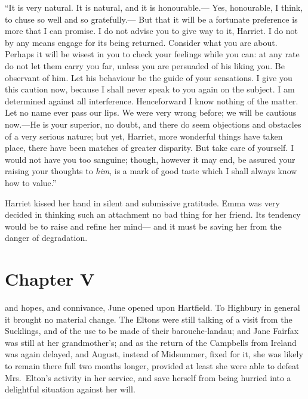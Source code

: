 ``It is very natural.  It is natural, and it is honourable.---%
Yes, honourable, I think, to chuse so well and so gratefully.---%
But that it will be a fortunate preference is more that I can promise.
I do not advise you to give way to it, Harriet.  I do not by any
means engage for its being returned.  Consider what you are about.
Perhaps it will be wisest in you to check your feelings while you can:
at any rate do not let them carry you far, unless you are persuaded
of his liking you.  Be observant of him.  Let his behaviour be the
guide of your sensations.  I give you this caution now, because I
shall never speak to you again on the subject.  I am determined
against all interference.  Henceforward I know nothing of the matter.
Let no name ever pass our lips.  We were very wrong before;
we will be cautious now.---He is your superior, no doubt, and there
do seem objections and obstacles of a very serious nature;
but yet, Harriet, more wonderful things have taken place, there have
been matches of greater disparity.  But take care of yourself.
I would not have you too sanguine; though, however it may end,
be assured your raising your thoughts to \emph{him}, is a mark of good taste
which I shall always know how to value.''

Harriet kissed her hand in silent and submissive gratitude.
Emma was very decided in thinking such an attachment no bad thing
for her friend.  Its tendency would be to raise and refine her mind---%
and it must be saving her from the danger of degradation.



\chapter{Chapter V}


 and hopes, and connivance, June opened
upon Hartfield.  To Highbury in general it brought no material change.
The Eltons were still talking of a visit from the Sucklings,
and of the use to be made of their barouche-landau; and Jane Fairfax
was still at her grandmother's; and as the return of the Campbells
from Ireland was again delayed, and August, instead of Midsummer,
fixed for it, she was likely to remain there full two months longer,
provided at least she were able to defeat Mrs.\ Elton's activity
in her service, and save herself from being hurried into a delightful
situation against her will.

